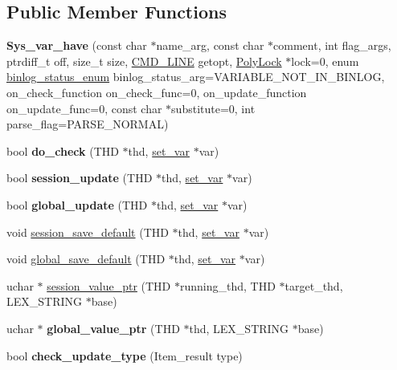 \subsection*{Public Member Functions}
\begin{DoxyCompactItemize}
\item 
\mbox{\label{classSys__var__have_a97c66dcd74b42211dedaf54a62791a3c}} 
{\bfseries Sys\+\_\+var\+\_\+have} (const char $\ast$name\+\_\+arg, const char $\ast$comment, int flag\+\_\+args, ptrdiff\+\_\+t off, size\+\_\+t size, \mbox{\hyperlink{structCMD__LINE}{C\+M\+D\+\_\+\+L\+I\+NE}} getopt, \mbox{\hyperlink{classPolyLock}{Poly\+Lock}} $\ast$lock=0, enum \mbox{\hyperlink{classsys__var_a664520ec82191888717c86085bfa83ce}{binlog\+\_\+status\+\_\+enum}} binlog\+\_\+status\+\_\+arg=V\+A\+R\+I\+A\+B\+L\+E\+\_\+\+N\+O\+T\+\_\+\+I\+N\+\_\+\+B\+I\+N\+L\+OG, on\+\_\+check\+\_\+function on\+\_\+check\+\_\+func=0, on\+\_\+update\+\_\+function on\+\_\+update\+\_\+func=0, const char $\ast$substitute=0, int parse\+\_\+flag=P\+A\+R\+S\+E\+\_\+\+N\+O\+R\+M\+AL)
\item 
\mbox{\label{classSys__var__have_ac61431c42b51114fe4b2429f8a6ff59f}} 
bool {\bfseries do\+\_\+check} (T\+HD $\ast$thd, \mbox{\hyperlink{classset__var}{set\+\_\+var}} $\ast$var)
\item 
\mbox{\label{classSys__var__have_aa0a814d3335fa7b06a4d92368d783a77}} 
bool {\bfseries session\+\_\+update} (T\+HD $\ast$thd, \mbox{\hyperlink{classset__var}{set\+\_\+var}} $\ast$var)
\item 
\mbox{\label{classSys__var__have_a44742cf019f8a1c18c36da40adbf9e63}} 
bool {\bfseries global\+\_\+update} (T\+HD $\ast$thd, \mbox{\hyperlink{classset__var}{set\+\_\+var}} $\ast$var)
\item 
void \mbox{\hyperlink{classSys__var__have_a9440d30a06f06a6b5dd8ca3aa436ce94}{session\+\_\+save\+\_\+default}} (T\+HD $\ast$thd, \mbox{\hyperlink{classset__var}{set\+\_\+var}} $\ast$var)
\item 
void \mbox{\hyperlink{classSys__var__have_aeaccee0596984bf2f934b7b57a8e2bd1}{global\+\_\+save\+\_\+default}} (T\+HD $\ast$thd, \mbox{\hyperlink{classset__var}{set\+\_\+var}} $\ast$var)
\item 
uchar $\ast$ \mbox{\hyperlink{classSys__var__have_afdc6eb2392515af389e3615adbfa071f}{session\+\_\+value\+\_\+ptr}} (T\+HD $\ast$running\+\_\+thd, T\+HD $\ast$target\+\_\+thd, L\+E\+X\+\_\+\+S\+T\+R\+I\+NG $\ast$base)
\item 
\mbox{\label{classSys__var__have_ab39245fc678c88916a3f5c0a420b80c5}} 
uchar $\ast$ {\bfseries global\+\_\+value\+\_\+ptr} (T\+HD $\ast$thd, L\+E\+X\+\_\+\+S\+T\+R\+I\+NG $\ast$base)
\item 
\mbox{\label{classSys__var__have_acd87131763fb1a6dc16e7cfe66670a39}} 
bool {\bfseries check\+\_\+update\+\_\+type} (Item\+\_\+result type)
\end{DoxyCompactItemize}
